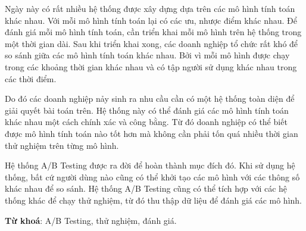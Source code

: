 Ngày này có rất nhiều hệ thống được xây dựng dựa trên các mô hình tính toán khác nhau.
Với mỗi mô hình tính toán lại có các ưu, nhược điểm khác nhau.
Để đánh giá mỗi mô hình tính toán, cần triển khai mỗi mô hình trên hệ thống trong một thời gian dài.
Sau khi triển khai xong, các doanh nghiệp tổ chức rất khó để so sánh giữa các mô hình tính toán khác nhau.
Bởi vì mỗi mô hình được chạy trong các khoảng thời gian khác nhau và có tập người sử dụng khác nhau
trong các thời điểm.

Do đó các doanh nghiệp nảy sinh ra nhu cầu cần có một hệ thống toàn diện để giải quyết bài toán trên.
Hệ thống này có thể đánh giá các mô hình tính toán khác nhau một cách chính xác và công bằng.
Từ đó doanh nghiệp có thể biết được mô hình tính toán nào tốt hơn mà không cần phải tốn quá nhiều
thời gian thử nghiệm trên từng mô hình.

Hệ thống A/B Testing được ra đời để hoàn thành mục đích đó. Khi sử dụng hệ thống, bất cứ người dùng
nào cũng có thể khởi tạo các mô hình với các thông số khác nhau để so sánh. Hệ thống A/B Testing cũng
có thể tích hợp với các hệ thống khác để chạy thử nghiệm, từ đó thu thập dữ liệu để đánh giá các mô
hình.

\textbf{Từ khoá}: A/B Testing, thử nghiệm, đánh giá.

